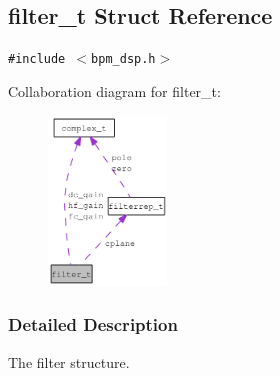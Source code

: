 \subsection{filter\_\-t Struct Reference}
\label{structfilter__t}
{\tt \#include $<$bpm\_\-dsp.h$>$}

Collaboration diagram for filter\_\-t:\nopagebreak
\begin{figure}[H]
\begin{center}
\leavevmode
\includegraphics[width=89pt]{structfilter__t__coll__graph}
\end{center}
\end{figure}


\subsubsection{Detailed Description}
The filter structure. 

